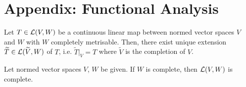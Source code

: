\documentclass{article}
\begin{document}
%    



\pagebreak
\section{Appendix: Functional Analysis}

\begin{ftheorem}
    Let $T \in {\cal{L}}(V, W)$ be a continuous linear map between normed vector spaces $V$ and $W$ with $W$ completely metrisable. Then, there exist unique extension $\widetilde{T} \in {\cal{L}}(\widetilde{V}, W)$ of $T$, i.e. $\widetilde{T}|_V = T$ where $\widetilde{V}$ is the completion of $V$. 
\end{ftheorem}

\begin{ftheorem}
    Let normed vector spaces $V$, $W$ be given. If $W$ is complete, then  ${\cal{L}}(V, W)$ is complete. 
\end{ftheorem}
\end{document}
